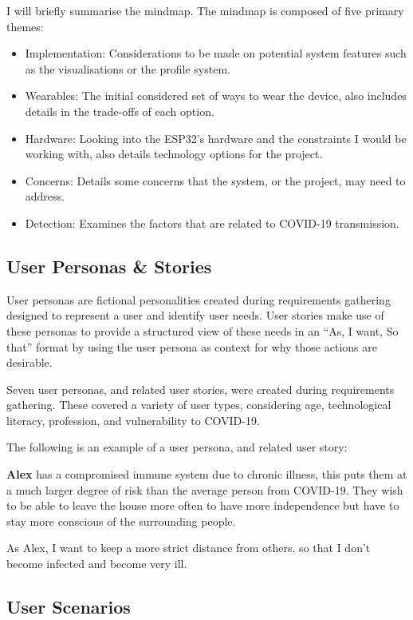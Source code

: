 \documentclass{l4proj}
\begin{document}
I will briefly summarise the mindmap. The mindmap is composed of five primary themes:
\begin{itemize}
    \item Implementation: Considerations to be made on potential system features such as the visualisations or the profile system.
    \item Wearables: The initial considered set of ways to wear the device, also includes details in the trade-offs of each option.
    \item Hardware: Looking into the ESP32's hardware and the constraints I would be working with, also details technology options for the project.
    \item Concerns: Details some concerns that the system, or the project, may need to address.
    \item Detection: Examines the factors that are related to COVID-19 transmission.
\end{itemize}

\subsection{User Personas \& Stories}

User personas are fictional personalities created during requirements gathering designed to represent a user and identify user needs. User stories make use of these personas to provide a structured view of these needs in an “As, I want, So that” format by using the user persona as context for why those actions are desirable.

Seven user personas, and related user stories, were created during requirements gathering. These covered a variety of user types, considering age, technological literacy, profession, and vulnerability to COVID-19.

The following is an example of a user persona, and related user story:

\textbf{Alex} has a compromised immune system due to chronic illness, this puts them at a much larger degree of risk than the average person from COVID-19. They wish to be able to leave the house more often to have more independence but have to stay more conscious of the surrounding people.

As Alex, I want to keep a more strict distance from others, so that I don't become infected and become very ill.

\subsection{User Scenarios}
\end{document}
